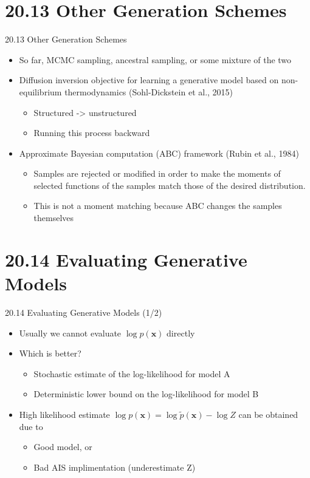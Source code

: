 \documentclass[dvipdfmx,presentation]{beamer}
\def\bf{\mathbf}
\begin{document}
\section{20.13 Other Generation Schemes}
\label{sec:orgheadline52}
\begin{frame}[label={sec:orgheadline51}]{20.13 Other Generation Schemes}
\begin{itemize}
\item So far, MCMC sampling, ancestral sampling, or some mixture of the two
\item Diffusion inversion objective for learning a generative model based on non-equilibrium thermodynamics (Sohl-Dickstein et al., 2015)
\begin{itemize}
\item Structured -> unstructured
\item Running this process backward
\end{itemize}
\item Approximate Bayesian computation (ABC) framework (Rubin et al., 1984)
\begin{itemize}
\item Samples are rejected or modified in order to make the moments of selected functions of the samples match those of the desired distribution.
\item This is not a moment matching because ABC changes the samples themselves
\end{itemize}
\end{itemize}
\end{frame}
\section{20.14 Evaluating Generative Models}
\label{sec:orgheadline56}
\begin{frame}[label={sec:orgheadline53}]{20.14 Evaluating Generative Models (1/2)}
\begin{itemize}
\item Usually we cannot evaluate \(\log p(\bf{x})\) directly
\item Which is better?
\begin{itemize}
\item Stochastic estimate of the log-likelihood for model A
\item Deterministic lower bound on the log-likelihood for model B
\end{itemize}
\item High likelihood estimate \(\log p(\bf{x}) = \log \tilde{p}(\bf{x}) - \log Z\) can be obtained due to
\begin{itemize}
\item Good model, or
\item Bad AIS implimentation (underestimate Z)
\end{itemize}
\end{itemize}
\end{frame}
\end{document}

